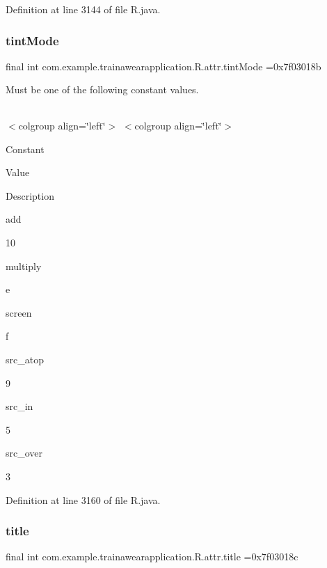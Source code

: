 Definition at line 3144 of file R.\+java.

\mbox{\label{classcom_1_1example_1_1trainawearapplication_1_1_r_1_1attr_a3b4186ffc1d83d1e162896b35873a5ee}} 
\subsubsection{\texorpdfstring{tintMode}{tintMode}}
{\footnotesize\ttfamily final int com.\+example.\+trainawearapplication.\+R.\+attr.\+tint\+Mode =0x7f03018b\hspace{0.3cm}{\ttfamily [static]}}

Must be one of the following constant values.

\tabulinesep=1mm
\begin{longtabu}spread 0pt [c]{*{0}{|X[-1]}|}
\hline
\end{longtabu}
$<$colgroup align=\char`\"{}left\char`\"{}$>$ $<$colgroup align=\char`\"{}left\char`\"{}$>$ 

Constant

Value

Description 

add

10

multiply

e

screen

f

src\+\_\+atop

9

src\+\_\+in

5

src\+\_\+over

3

Definition at line 3160 of file R.\+java.

\mbox{\label{classcom_1_1example_1_1trainawearapplication_1_1_r_1_1attr_acf87c7372dec6d277cc72aa7d37515c8}} 
\subsubsection{\texorpdfstring{title}{title}}
{\footnotesize\ttfamily final int com.\+example.\+trainawearapplication.\+R.\+attr.\+title =0x7f03018c\hspace{0.3cm}{\ttfamily [static]}}

